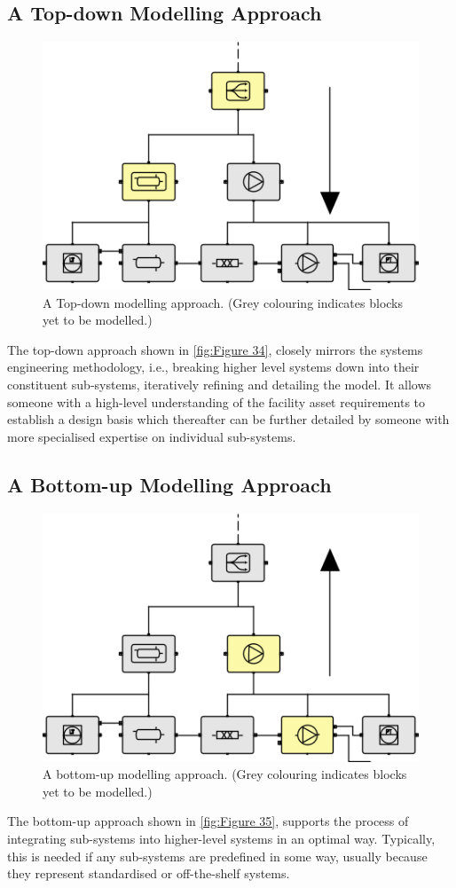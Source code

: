 \documentclass[../main.tex]{subfiles}
\begin{document}
\subsection{A Top-down Modelling Approach}
\begin{figure}[htb]
  \centering
  \includegraphics[width=.5\textwidth]{img/IMFmanual-img053.png}
  \caption[A top-down modelling approach.]{A Top-down modelling approach. (Grey
colouring indicates blocks yet to be modelled.)}
  \label{fig:Figure 34}
\end{figure}

The top-down approach shown in \autoref{fig:Figure 34}, closely mirrors the systems engineering methodology, i.e., breaking higher
level systems down into their constituent sub-systems, iteratively refining and detailing the model. It allows
someone with a high-level understanding of the facility asset requirements to establish a design basis which
thereafter can be further detailed by someone with more specialised expertise on individual sub-systems. 

\subsection{A Bottom-up Modelling Approach}
\begin{figure}[htb]
  \centering
  \includegraphics[width=.5\textwidth]{img/IMFmanual-img054.png}
  \caption[A bottom-up modelling approach.]{A bottom-up modelling approach. (Grey colouring indicates blocks yet to be modelled.)}
  \label{fig:Figure 35}
\end{figure}

The bottom-up approach shown in \autoref{fig:Figure 35}, supports the process of integrating sub-systems into higher-level systems
in an optimal way. Typically, this is needed if any sub-systems are predefined in some way, usually because they
represent standardised or off-the-shelf systems. 
\end{document}
